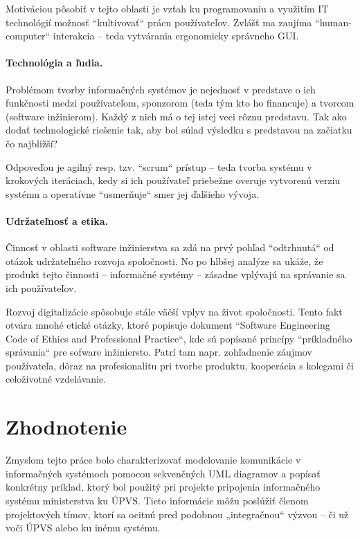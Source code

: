 \documentclass[10pt,twoside,slovak,a4paper]{article}
\begin{document}
Motiváciou pôsobiť v tejto oblasti je vzťah ku programovaniu a využitím IT technológií možnosť ``kultivovať“ prácu používateľov. Zvlášť ma zaujíma ``human-computer“ interakcia – teda vytvárania ergonomicky správneho GUI.

\paragraph{Technológia a ľudia.}

Problémom tvorby informačných systémov je nejednosť v predstave o ich funkčnosti medzi používateľom, sponzorom (teda tým kto ho financuje) a tvorcom (software inžinierom). Každý z nich má o tej istej veci rôznu predstavu. Tak ako dodať technologické riešenie tak, aby bol súlad výsledku s predstavou na začiatku čo najbližší?

\noindent Odpoveďou je agilný resp. tzv.  ``scrum“ prístup – teda tvorba systému v krokových iteráciach, kedy si ich používateľ priebežne overuje vytvorenú verziu systému a operatívne ``usmerňuje“ smer jej ďalšieho vývoja.

\paragraph{Udržateľnosť a etika.}

Činnosť v oblasti software inžinierstva sa zdá na prvý pohľad ``odtrhnutá“ od otázok udržateľného rozvoja spoločnosti. No po hlbšej analýze sa ukáže, že produkt tejto činnosti – informačné systémy – zásadne vplývajú na správanie sa ich používateľov. 

\noindent Rozvoj digitalizácie spôsobuje stále väčší vplyv na život spoločnosti. Tento fakt otvára mnohé etické otázky, ktoré popisuje dokument ``Software Engineering Code of Ethics and Professional Practice“, kde sú popísané princípy ``príkladného správania“ pre sofware inžiniersto. Patrí tam napr. zohľadnenie záujmov používateľa, dôraz na profesionalitu pri tvorbe produktu, kooperácia s kolegami či celoživotné vzdelávanie.


\section{Zhodnotenie} \label{6sek} 
Zmyslom tejto práce bolo charakterizovať modelovanie komunikácie v informačných systémoch pomocou sekvenčných UML diagramov a popísať konkrétny príklad, ktorý bol použitý pri projekte pripojenia informačného systému ministerstva ku ÚPVS.
Tieto informácie môžu poslúžiť členom projektových tímov, ktorí sa ocitnú pred podobnou „integračnou“ výzvou – či už voči ÚPVS alebo ku inému systému. \\

\newpage





 
\end{document}
